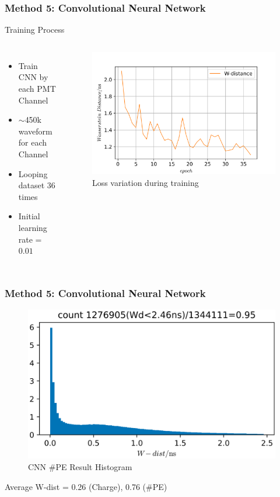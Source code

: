 \documentclass{beamer}
\begin{document}
\begin{frame}
\frametitle{Method 5: Convolutional Neural Network}
\Large Training Process \normalsize
\begin{columns}
\begin{itemize}
    \item Train CNN by each PMT Channel
    \item $\sim$450k waveform for each Channel
    \item Looping dataset 36 times
    \item Initial learning rate = $0.01$
\end{itemize}
\begin{figure}
    \centering
    \caption{Loss variation during training}
    \includegraphics[width=1.0\linewidth]{img/epoch.png}
\end{figure}
\end{columns}
\end{frame}

\begin{frame}
\frametitle{Method 5: Convolutional Neural Network}
\begin{figure}
    \centering
    \caption{CNN \#PE Result Histogram}
    \includegraphics[width=0.85\linewidth]{img/takarapenumhist.png}
\end{figure}
\begin{center}
    Average W-dist = 0.26 (Charge), 0.76 (\#PE)
\end{center}
\end{frame}
\end{document}
